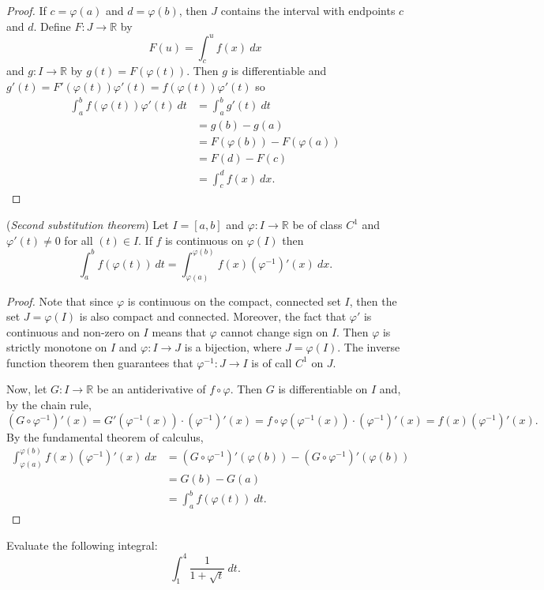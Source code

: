 \documentclass[11pt]{article}
\theoremstyle{definition}
\newcommand{\R}{\mathbb{R}}                      %
\begin{document}
\begin{proof}
    If $c=\varphi(a)$ and $d=\varphi(b)$, then $J$ contains the interval with endpoints $c$ and $d$. Define $F:J\to \R$ by 
    $$
    F(u)=\int_c^u f(x)~dx
    $$
    and $g:I\to \R$ by $g(t)=F(\varphi(t))$. Then $g$ is differentiable and $g'(t)=F'(\varphi(t))\varphi'(t)=f(\varphi(t))\varphi'(t)$ so
    $$
    \begin{aligned}
    \int_a^b f(\varphi(t))\varphi'(t)~dt&=\int_a^b g'(t)~dt \\
    &=g(b)-g(a)\\
    &=F(\varphi(b))-F(\varphi(a))\\
    &=F(d)-F(c)\\
    &=\int_c^d f(x)~dx.
    \end{aligned}
    $$
\end{proof}
\prop (\textit{Second substitution theorem}) Let $I=[a,b]$ and $\varphi:I\to \R$ be of class $C^1$ and $\varphi'(t)\neq 0$ for all $(t)\in I$. If $f$ is continuous on $\varphi(I)$ then 
$$
\int_a^b f(\varphi(t))~dt=\int_{\varphi(a)}^{\varphi(b)} f(x)\left(\varphi^{-1}\right)'(x)~dx.
$$
\begin{proof}
    Note that since $\varphi$ is continuous on the compact, connected set $I$, then the set $J=\varphi(I)$ is also compact and connected. Moreover, the fact that $\varphi'$ is continuous and non-zero on $I$ means that $\varphi$ cannot change sign on $I$. Then $\varphi$ is strictly monotone on $I$ and $\varphi:I\to J$ is a bijection, where $J=\varphi(I)$. The inverse function theorem then guarantees that $\varphi^{-1}:J\to I$  is of call $C^1$ on $J$.

    Now, let $G:I\to \R$ be an antiderivative of $f\circ \varphi$. Then $G$ is differentiable on $I$ and, by the chain rule,
    $$
    (G\circ \varphi^{-1})'(x) = G'(\varphi^{-1}(x)) \cdot (\varphi^{-1})'(x) = f\circ \varphi(\varphi^{-1}(x))\cdot (\varphi^{-1})'(x)=f(x)(\varphi^{-1})'(x).
    $$
    By the fundamental theorem of calculus,
    $$
    \begin{aligned}
        \int_{\varphi(a)}^{\varphi(b)} f(x)\left(\varphi^{-1}\right)'(x)~dx &= (G\circ \varphi^{-1})'(\varphi(b)) -(G\circ \varphi^{-1})'(\varphi(b))\\
        &=G(b)-G(a)\\
        &=\int_a^b f(\varphi(t))~dt.
    \end{aligned}
    $$
\end{proof}

\ex Evaluate the following integral:
$$
\int_1^4 \frac{1}{1+\sqrt{t}}~dt.
$$
\end{document}
